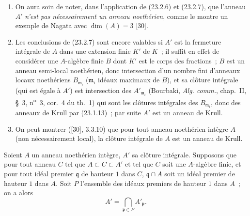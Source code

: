 \begin{remarks}[23.2.8]
\label{0.23.2.8-fr}
\begin{enumerate}
  \item[(i)] On aura soin de noter, dans l'application de (23.2.6) et
  (23.2.7), que l'anneau $A'$ \emph{n'est pas nécessairement un anneau
  noethérien}, comme le montre un exemple de Nagata avec $\dim(A)=3$ [30].

  \item[(ii)] Les conclusions de (23.2.7) sont encore valables si $A'$ est
  la fermeture intégrale de $A$ dans une extension finie $K'$ de $K$~; il
  suffit en effet de considérer une $A$-algèbre finie $B$ dont $K'$ est le
  corps des fractions~; $B$ est un anneau semi-local noethérien, donc
  intersection d'un nombre fini d'anneaux locaux noethériens
  $B_{\mathfrak m_i}$ ($\mathfrak m_i$ idéaux maximaux de $B$), et sa clôture
  intégrale (qui est égale à $A'$) est intersection des
  $A'_{\mathfrak m_i}$ (Bourbaki, \emph{Alg. comm.}, chap.~II, §~3,
  n\textsuperscript{o}~3, cor.~4 du th.~1) qui sont les clôtures intégrales
  des $B_{\mathfrak m_i}$, donc des anneaux de Krull par (23.1.13)~; par
  suite $A'$ est un anneau de Krull.

  \item[(iii)] On peut montrer ([30], 3.3.10) que pour tout anneau noethérien
  intègre $A$ (non nécessairement local), la clôture intégrale de $A$ est un
  anneau de Krull.
\end{enumerate}
\end{remarks}

\begin{corollary}[23.2.9]
\label{0.23.2.9-fr}
Soient $A$ un anneau noethérien intègre, $A'$ sa clôture intégrale. Supposons
que pour tout anneau $C$ tel que $A\subset C\subset A'$ et tel que $C$ soit
une $A$-algèbre finie, et pour tout idéal premier $\mathfrak q$ de hauteur $1$
dans $C$, $\mathfrak q\cap A$ soit un idéal premier de hauteur $1$ dans $A$.
Soit $P$ l'ensemble des idéaux premiers de hauteur $1$ dans $A$~; on a alors
\[
  A'=\bigcap_{\mathfrak p\in P}A'_{\mathfrak p}.
\]
\end{corollary}

